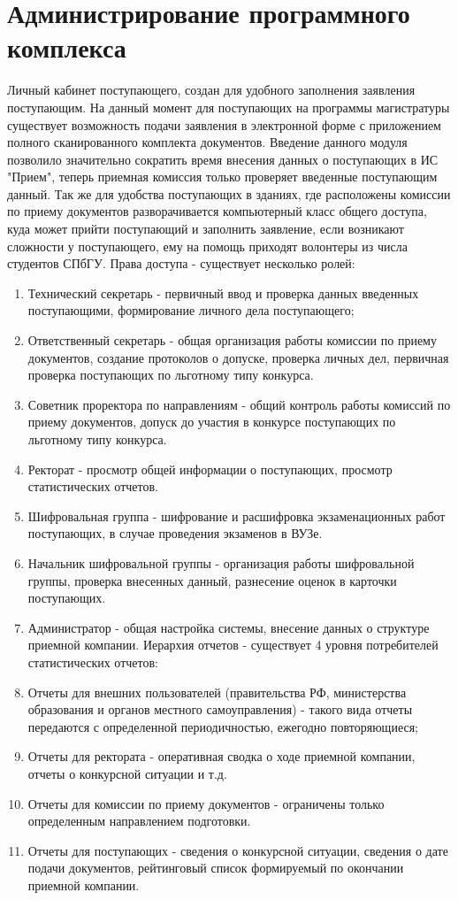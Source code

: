 \documentclass[]{article}
\begin{document}
\section{Администрирование программного комплекса}
Личный кабинет поступающего, создан для удобного заполнения заявления поступающим. На данный момент для поступающих на программы магистратуры существует возможность подачи заявления в электронной форме с приложением полного сканированного комплекта документов. Введение данного модуля позволило значительно сократить время внесения данных о поступающих в ИС "Прием", теперь приемная комиссия только проверяет введенные поступающим данный. Так же для удобства поступающих в зданиях, где расположены комиссии по приему документов разворачивается компьютерный класс общего доступа, куда может прийти поступающий и заполнить заявление, если возникают сложности у поступающего, ему на помощь приходят волонтеры из числа студентов СПбГУ.
Права доступа - существует несколько ролей:
\begin{enumerate}
\item Технический секретарь - первичный ввод и проверка данных введенных поступающими, формирование личного дела поступающего;
\item Ответственный секретарь - общая организация работы комиссии по приему документов, создание протоколов о допуске, проверка личных дел, первичная проверка поступающих по льготному типу конкурса.
\item Советник проректора по направлениям - общий контроль работы комиссий по приему документов, допуск до участия в конкурсе поступающих по льготному типу конкурса.
\item Ректорат - просмотр общей информации о поступающих, просмотр статистических отчетов.
\item Шифровальная группа - шифрование и расшифровка экзаменационных работ поступающих, в случае проведения экзаменов в ВУЗе.
\item Начальник шифровальной группы - организация работы шифровальной группы, проверка внесенных данный, разнесение оценок в карточки поступающих.
\item Администратор - общая настройка системы, внесение данных о структуре приемной компании.
Иерархия отчетов - существует 4 уровня потребителей статистических отчетов:
\item Отчеты для внешних пользователей (правительства РФ, министерства образования и органов местного самоуправления) - такого вида отчеты передаются с определенной периодичностью, ежегодно повторяющиеся;
\item Отчеты для ректората - оперативная сводка о ходе приемной компании, отчеты о конкурсной ситуации и т.д.
\item Отчеты для комиссии по приему документов - ограничены только определенным направлением подготовки.
\item Отчеты для поступающих - сведения о конкурсной ситуации, сведения о дате подачи документов, рейтинговый список формируемый по окончании приемной компании.
\end{enumerate}
\end{document}
